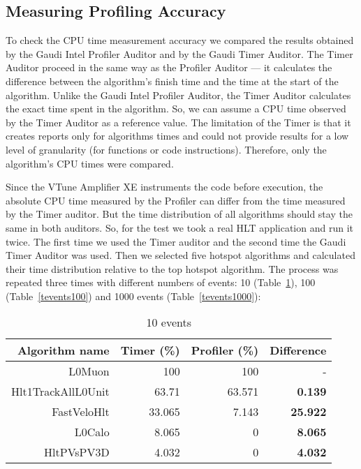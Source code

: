 \subsection{Measuring Profiling Accuracy}

To check the CPU time measurement accuracy we compared the results obtained by
the Gaudi Intel Profiler Auditor and by the Gaudi Timer Auditor. The Timer
Auditor proceed  in the same way as the Profiler Auditor --- it calculates the
difference between the algorithm’s finish time and the time at the start of the
algorithm. Unlike the Gaudi Intel Profiler Auditor, the Timer Auditor
calculates the exact time spent in the algorithm. So, we can assume a CPU time
observed by the Timer Auditor as a reference value. The limitation of the Timer
is that it creates reports only for algorithms times  and could not provide
results for a low level of granularity (for functions or code instructions).
Therefore, only the algorithm’s CPU times were compared.

Since the VTune Amplifier XE instruments the code before execution, the
absolute CPU time measured by the Profiler can differ from the time measured by
the Timer auditor.  But the time distribution of all algorithms should stay the
same in both auditors.  So, for the test we took a real HLT application and run
it twice. The first time we used the Timer auditor and the second time the
Gaudi Timer Auditor was used. Then we selected five hotspot algorithms and
calculated their time distribution relative to the top hotspot algorithm. The
process was repeated three times with different numbers of events: 10
(Table~\ref{tevents10}), 100 (Table~\ref{tevents100}) and 1000 events
(Table~\ref{tevents1000}):

\begin{table}[H]
\caption{\label{tevents10}10 events}
\begin{center}
\begin{tabular}{rrrr}\toprule
Algorithm name & Timer (\%) & Profiler (\%) & \bf{Difference} \\
\midrule
L0Muon & 100 & 100 & -\\
Hlt1TrackAllL0Unit & 63.71 & 63.571 & \bf{0.139}\\
FastVeloHlt & 33.065 & 7.143 & \bf{25.922}\\
L0Calo & 8.065 & 0 & \bf{8.065}\\
HltPVsPV3D & 4.032 & 0 & \bf{4.032}\\
\bottomrule
\end{tabular}
\end{center}
\end{table}


